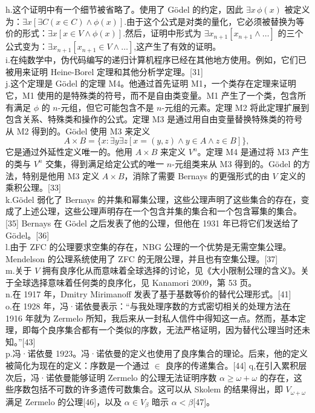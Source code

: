 h.这个证明中有一个细节被省略了。使用了 Gödel 的约定，因此 \(\exists x \, \phi(x)\) 被定义为：\(\exists x [\exists C (x \in C) \land \phi(x)]\).由于这个公式是对类的量化，它必须被替换为等价的形式：\(\exists x [x \in V \land \phi(x)]\).然后，证明中形式为 \(\exists x_{n+1} [x_{n+1} \land \dots]\) 的三个公式变为：\(\exists x_{n+1} [x_{n+1} \in V \land \dots]\),这产生了有效的证明。\\
i.在纯数学中，伪代码编写的递归计算机程序已经在其他地方使用。例如，它们已被用来证明 Heine-Borel 定理和其他分析学定理。[31]\\
j.这个定理是 Gödel 的定理 M4。他通过首先证明 M1，一个类存在定理来证明它，M1 使用的是特殊类的符号，而不是自由类变量。M1 产生了一个类，包含所有满足 \(\phi\) 的 \(n\)-元组，但它可能包含不是 \(n\)-元组的元素。定理 M2 将此定理扩展到包含关系、特殊类和操作的公式。定理 M3 是通过用自由变量替换特殊类的符号从 M2 得到的。Gödel 使用 M3 来定义
\[
A \times B = \{ x : \exists y \exists z [ x = (y, z) \land y \in A \land z \in B ] \},~
\]
它是通过外延性定义唯一的。他用 \(A \times B\) 来定义 \(V^n\)。定理 M4 是通过将 M3 产生的类与 \(V^n\) 交集，得到满足给定公式的唯一 \(n\)-元组类来从 M3 得到的。Gödel 的方法，特别是他用 M3 定义 \(A \times B\)，消除了需要 Bernays 的更强形式的由 \(V\) 定义的乘积公理。[33]\\  
k.Gödel 弱化了 Bernays 的并集和幂集公理，这些公理声明了这些集合的存在，变成了上述公理，这些公理声明存在一个包含并集的集合和一个包含幂集的集合。[35] Bernays 在 Gödel 之后发表了他的公理，但他在 1931 年已将它们发送给了 Gödel。[36]\\
l.由于 ZFC 的公理要求空集的存在，NBG 公理的一个优势是无需空集公理。Mendelson 的公理系统使用了 ZFC 的无限公理，并且也有空集公理。[37]\\
m.关于 \(V\) 拥有良序化从而意味着全球选择的讨论，见《大小限制公理的含义》。关于全球选择意味着任何类的良序化，见 Kanamori 2009，第 53 页。\\
n.在 1917 年，Dmitry Mirimanoff 发表了基于基数等价的替代公理形式。[41]\\
o.在 1928 年，冯·诺依曼表示：“与我处理序数的方式密切相关的处理方法在 1916 年就为 Zermelo 所知，我后来从一封私人信件中得知这一点。然而，基本定理，即每个良序集合都有一个类似的序数，无法严格证明，因为替代公理当时还未知。”[43]\\
p.冯·诺依曼 1923。冯·诺依曼的定义也使用了良序集合的理论。后来，他的定义被简化为现在的定义：序数是一个通过 \(\in\) 良序的传递集合。[44]
q,在引入累积层次后，冯·诺依曼能够证明 Zermelo 的公理无法证明序数 \(\alpha \geq \omega + \omega\) 的存在，这些序数包括不可数的许多遗传可数集合。这可以从 Skolem 的结果得出，即 \(V_{\omega + \omega}\) 满足 Zermelo 的公理[46]，以及 \(\alpha \in V_{\beta}\) 暗示 \(\alpha < \beta\)[47]。\\
